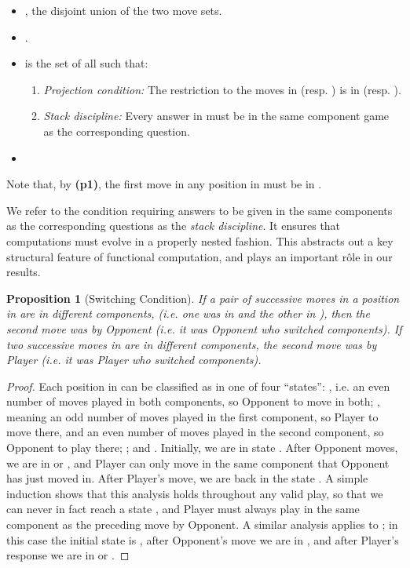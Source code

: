 \documentclass[11pt]{article}
\newtheorem{proposition}[theorem]{Proposition}
\begin{document}
\begin{itemize}
\item , the disjoint union of the two move
sets.
\item .
\item  is the set of all 
such that:
\begin{enumerate}
\item {\em Projection condition:} The restriction to the moves in  (resp. ) is in
 (resp. ).
\item {\em Stack discipline:} Every answer in  must be in the same component game as the
  corresponding question.
\end{enumerate}

\item 
\end{itemize}
Note that, by {\bf (p1)}, the first move in any position in
 must be in .

We refer to the condition requiring answers to be given in the same
components as the corresponding questions as the {\sl stack discipline}.
It ensures that computations must evolve in a properly nested fashion.
This abstracts out a key structural feature of functional computation, and plays
an important r\^{o}le in our results.

\begin{proposition}[Switching Condition]
If a pair of successive moves in a position in  are in different
components, (i.e. one was in  and the other in ),
then the second move was by Opponent (i.e. it was Opponent who
switched components). If two successive moves in  are
in different components, the second move was by Player (i.e. it was Player
who switched components).
\end{proposition}

\begin{proof} Each position in  can be classified as in
one of four ``states'': , i.e. an even number of moves
played in both components, so Opponent to move in both; ,
meaning an odd number of moves played in the first component, so
Player to move there, and an even number of moves played in the
second component, so Opponent to play there; ; and . Initially, we are in state . After Opponent moves, we
are in  or , and Player can only move in the same
component that Opponent has just moved in. After Player's move, we
are back in the state . A simple induction shows that this
analysis holds throughout any valid play, so that we can never in
fact reach a state , and Player must always play in the
same component as the preceding move by Opponent. A similar
analysis applies to ; in this case the initial state
is , after Opponent's move we are in , and after
Player's response we are in  or . 
\end{proof}
\end{document}
